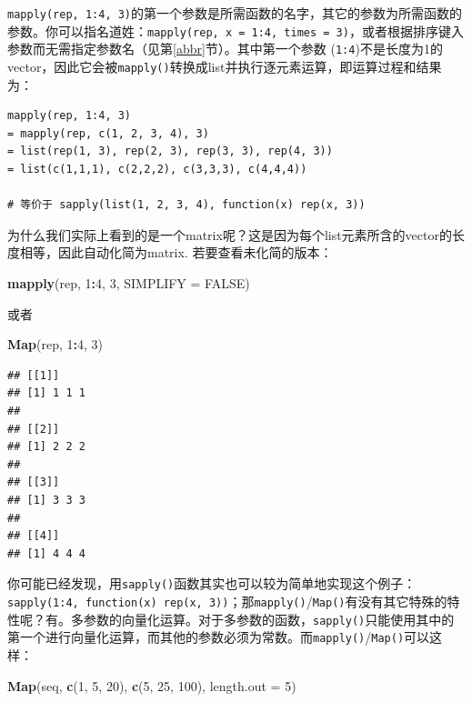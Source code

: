 \documentclass[]{book}
\newenvironment{Shaded}{\begin{snugshade}}{\end{snugshade}}
\newcommand{\DataTypeTok}[1]{\textcolor[rgb]{0.13,0.29,0.53}{#1}}
\newcommand{\DecValTok}[1]{\textcolor[rgb]{0.00,0.00,0.81}{#1}}
\newcommand{\KeywordTok}[1]{\textcolor[rgb]{0.13,0.29,0.53}{\textbf{#1}}}
\newcommand{\NormalTok}[1]{#1}
\newcommand{\OperatorTok}[1]{\textcolor[rgb]{0.81,0.36,0.00}{\textbf{#1}}}
\newcommand{\OtherTok}[1]{\textcolor[rgb]{0.56,0.35,0.01}{#1}}
\begin{document}
\texttt{mapply(rep,\ 1:4,\ 3)}的第一个参数是所需函数的名字，其它的参数为所需函数的参数。你可以指名道姓：\texttt{mapply(rep,\ x\ =\ 1:4,\ times\ =\ 3)}，或者根据排序键入参数而无需指定参数名（见第\ref{abbr}节）。其中第一个参数 (\texttt{1:4})不是长度为1的vector，因此它会被\texttt{mapply()}转换成list并执行逐元素运算，即运算过程和结果为：

\begin{verbatim}
mapply(rep, 1:4, 3)
= mapply(rep, c(1, 2, 3, 4), 3)
= list(rep(1, 3), rep(2, 3), rep(3, 3), rep(4, 3))
= list(c(1,1,1), c(2,2,2), c(3,3,3), c(4,4,4))

# 等价于 sapply(list(1, 2, 3, 4), function(x) rep(x, 3))
\end{verbatim}

为什么我们实际上看到的是一个matrix呢？这是因为每个list元素所含的vector的长度相等，因此自动化简为matrix. 若要查看未化简的版本：

\begin{Shaded}
\begin{Highlighting}[]
\KeywordTok{mapply}\NormalTok{(rep, }\DecValTok{1}\OperatorTok{:}\DecValTok{4}\NormalTok{, }\DecValTok{3}\NormalTok{, }\DataTypeTok{SIMPLIFY =} \OtherTok{FALSE}\NormalTok{)}
\end{Highlighting}
\end{Shaded}

或者

\begin{Shaded}
\begin{Highlighting}[]
\KeywordTok{Map}\NormalTok{(rep, }\DecValTok{1}\OperatorTok{:}\DecValTok{4}\NormalTok{, }\DecValTok{3}\NormalTok{)}
\end{Highlighting}
\end{Shaded}

\begin{verbatim}
## [[1]]
## [1] 1 1 1
## 
## [[2]]
## [1] 2 2 2
## 
## [[3]]
## [1] 3 3 3
## 
## [[4]]
## [1] 4 4 4
\end{verbatim}

你可能已经发现，用\texttt{sapply()}函数其实也可以较为简单地实现这个例子：\texttt{sapply(1:4,\ function(x)\ rep(x,\ 3))}；那\texttt{mapply()}/\texttt{Map()}有没有其它特殊的特性呢？有。多参数的向量化运算。对于多参数的函数，\texttt{sapply()}只能使用其中的第一个进行向量化运算，而其他的参数必须为常数。而\texttt{mapply()}/\texttt{Map()}可以这样：

\begin{Shaded}
\begin{Highlighting}[]
\KeywordTok{Map}\NormalTok{(seq, }\KeywordTok{c}\NormalTok{(}\DecValTok{1}\NormalTok{, }\DecValTok{5}\NormalTok{, }\DecValTok{20}\NormalTok{), }\KeywordTok{c}\NormalTok{(}\DecValTok{5}\NormalTok{, }\DecValTok{25}\NormalTok{, }\DecValTok{100}\NormalTok{), }\DataTypeTok{length.out =} \DecValTok{5}\NormalTok{)}
\end{Highlighting}
\end{Shaded}
\end{document}
